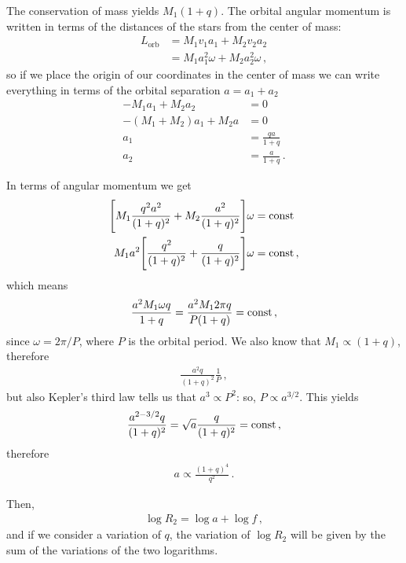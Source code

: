 \documentclass[main.tex]{subfiles}
\begin{document}
The conservation of mass yields \(M_1 (1 + q)\). 
The orbital angular momentum is written in terms of the distances of the stars from the center of mass:
%
\begin{align}
L _{\text{orb}} &= M_1 v_1 a_1 + M_2 v_2 a_2  \\
&= M_1 a_1^2 \omega + M_2 a_2^2 \omega 
\,,
\end{align}
%
so if we place the origin of our coordinates in the center of mass we can write everything in terms of the orbital separation \(a = a_1 + a_2 \)
%
\begin{align}
-M_1 a_1 + M_2 a_2 &= 0  \\
- (M_1 + M_2 ) a_1 + M_2 a &= 0  \\
a_1 &= \frac{qa}{1+q} \\
a_2 &= \frac{a}{1 +q}
\,.
\end{align}

In terms of angular momentum we get 
%
\begin{align}
\qty[
    M_1 \frac{q^2 a^2}{(1 + q)^2}
    + M_2 \frac{a^2}{(1+q)^2}
]\omega &= \text{const} \\
M_1 a^2
\qty[
    \frac{q^2}{(1 + q)^2}
    + \frac{q}{(1+q)^2}
]\omega &= \text{const} 
\,,
\end{align}
%
which means 
%
\begin{align}
\frac{a^2 M_1 \omega q}{1 + q} =
\frac{a^2 M_1 2 \pi  q}{P(1 + q)} 
= \text{const}
\,,
\end{align}
%
since \(\omega = 2\pi / P\), where \(P\) is the orbital period. 
We also know that \(M_1 \propto (1 + q)\), therefore 
%
\begin{align}
\frac{a^2 q}{(1+q)^2} \frac{1}{P}
\,,
\end{align}
%
but also Kepler's third law tells us that \(a^3 \propto P^2\): so, \(P \propto a^{3/2}\). This yields 
%
\begin{align}
\frac{a^{2 - 3/2} q}{(1+q)^2} = \sqrt{a} \frac{q}{(1+q)^2} = \text{const}
\,,
\end{align}
%
therefore 
%
\begin{align}
a \propto \frac{(1 + q)^{4}}{q^2}
\,.
\end{align}

Then, 
%
\begin{align}
\log R_2 = \log a + \log f
\,,
\end{align}
%
and if we consider a variation of \(q\), the variation of \(\log R_2 \) will be given by the sum of the variations of the two logarithms. 
\end{document}
